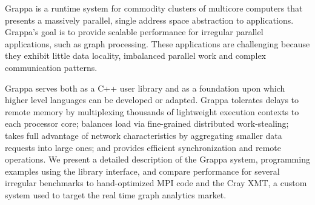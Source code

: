 Grappa is a runtime system for commodity clusters of multicore computers that
presents a massively parallel, single address space abstraction to
applications. Grappa's goal is to provide scalable performance for irregular
parallel applications, such as graph processing. These applications are
challenging because they exhibit little data locality, imbalanced parallel
work and complex communication patterns.

Grappa serves both as a C++ user library and as a foundation upon which higher
level languages can be developed or adapted. Grappa tolerates delays to remote
memory by multiplexing thousands of lightweight execution contexts to each
processor core; balances load via fine-grained distributed work-stealing;
takes full advantage of network characteristics by aggregating smaller data
requests into large ones; and provides efficient synchronization and remote
operations. We present a detailed description of the Grappa system,
programming examples using the library interface, and compare performance for
several irregular benchmarks to hand-optimized MPI code and the Cray XMT, a
custom system used to target the real time graph analytics market.
